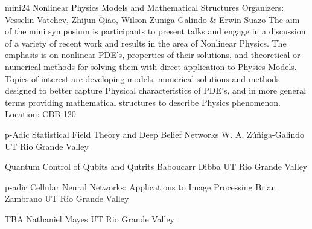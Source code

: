 \mini
{mini24}
{Nonlinear Physics Models and Mathematical Structures}
{Organizers: Vesselin Vatchev, Zhijun Qiao, Wilson Zuniga Galindo \& Erwin Suazo}
{The aim of the mini symposium is participants to present talks and engage in a discussion of a variety of recent work and results in the area of Nonlinear Physics. The emphasis is on nonlinear PDE’s, properties of their solutions, and theoretical or numerical methods for solving them with direct application to Physics Models. Topics of interest are developing models, numerical solutions and methods designed to better capture Physical characteristics of PDE’s, and in more general terms providing mathematical structures to describe Physics phenomenon.}
{Location: CBB 120}

\begin{talks}
\item\talk
{p-Adic Statistical Field Theory and Deep Belief Networks}
{W. A. Zúñiga-Galindo }
{UT Rio Grande Valley}
\item\talk
{Quantum Control of Qubits and Qutrits}
{Baboucarr Dibba}
{UT Rio Grande Valley}
\item\talk
{p-adic Cellular Neural Networks: Applications to Image Processing}
{Brian Zambrano}
{UT Rio Grande Valley}
\item\talk
{TBA}
{Nathaniel Mayes}
{UT Rio Grande Valley}
\end{talks}
\room
